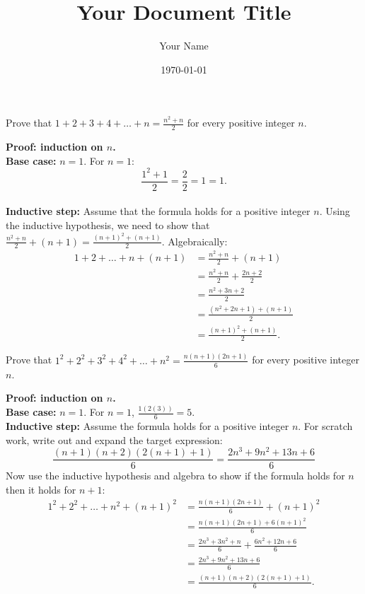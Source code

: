 \documentclass{article}
\title{Your Document Title}
\author{Your Name}
\date{\today} %
\begin{document}
\maketitle

\begin{problem}
Prove that $1 + 2 + 3 + 4 + \ldots + n = \frac{n^2 + n}{2}$ for every positive integer $n$.
\end{problem}

\textbf{Proof: induction on $n$.}
\\
\textbf{Base case:} $n = 1$. For $n = 1$:
$$\frac{1^2 + 1}{2} = \frac{2}{2} = 1 = 1.$$
\\

\textbf{Inductive step:} Assume that the formula holds for a positive integer $n$. Using the inductive hypothesis, we need to show that $\frac{n^2 + n}{2} + (n + 1) = \frac{(n + 1)^2 + (n + 1)}{2}$. Algebraically:
\begin{align*}
    1 + 2 + \ldots + n + (n + 1) & = \frac{n^2 + n}{2} + (n + 1)          \\
                                 & = \frac{n^2 + n}{2} + \frac{2n + 2}{2} \\
                                 & = \frac{n^2 + 3n + 2}{2}               \\
                                 & = \frac{(n^2 + 2n + 1) + (n + 1)}{2}   \\
                                 & = \frac{(n + 1)^2 + (n + 1)}{2}.
\end{align*}

\begin{problem}
Prove that $1^2 + 2^2 + 3^2 + 4^2 + \ldots + n^2 = \frac{n(n + 1)(2n + 1)}{6}$ for every positive integer $n$.
\end{problem}

\textbf{Proof: induction on $n$.}
\\

\textbf{Base case:} $n = 1$. For $n = 1$, $\frac{1(2(3))}{6} = 5$.
\\

\textbf{Inductive step:} Assume the formula holds for a positive integer $n$. For scratch work, write out and expand the target expression:
$$\frac{(n+1)(n+2)(2(n+1)+1)}{6} = \frac{2n^3 + 9n^2 + 13n + 6}{6}$$
Now use the inductive hypothesis and algebra to show if the formula holds for $n$ then it holds for $n+1$:
\begin{align*}
    1^2 + 2^2 + \ldots + n^2 + (n + 1)^2 & = \frac{n(n + 1)(2n + 1)}{6} + (n + 1)^2               \\
                                         & = \frac{n(n + 1)(2n + 1) + 6(n + 1)^2}{6}              \\
                                         & = \frac{2n^3 + 3n^2 + n}{6} + \frac{6n^2 + 12n + 6}{6} \\
                                         & = \frac{2n^3 + 9n^2 + 13n + 6}{6}                      \\
                                         & = \frac{(n + 1)(n + 2)(2(n + 1) + 1)}{6}.
\end{align*}
\end{document}
